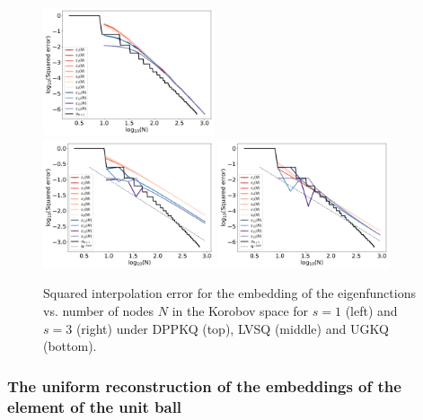 \documentclass[twoside,11pt]{book}
\numberwithin{theorem}{chapter}
\numberwithin{definition}{chapter}
\numberwithin{proposition}{chapter}
\numberwithin{corollary}{chapter}
\numberwithin{example}{chapter}
\numberwithin{lemma}{chapter}
\begin{document}
\begin{figure}
\includegraphics[width=0.45\textwidth]{img/neurips/multiSobolev/LVSQ_multig_interpolation_Korobov_s_2_fig_1.pdf}\\
\includegraphics[width=0.45\textwidth]{img/neurips/multiSobolev/UGKQ_multig_interpolation_Korobov_s_1_fig_1.pdf}
\includegraphics[width=0.45\textwidth]{img/neurips/multiSobolev/UGKQ_multig_interpolation_Korobov_s_2_fig_1.pdf}\\
\caption{Squared interpolation error for the embedding of the eigenfunctions vs. number of nodes $N$ in the Korobov space for $s = 1$ (left) and $s=3$ (right) under DPPKQ (top), LVSQ (middle) and UGKQ (bottom).
\label{fig:Korobov_multig_results}}
\end{figure} 

\subsubsection{The uniform reconstruction of the embeddings of the element of the unit ball}
\end{document}
